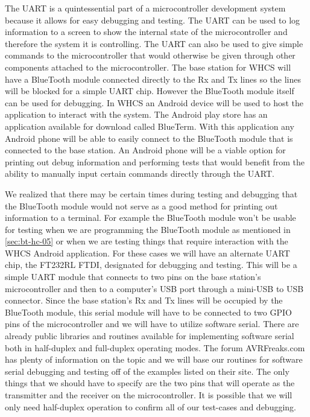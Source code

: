 The UART is a quintessential part of a microcontroller development system
because it allows for easy debugging and testing. The UART can be used to log
information to a screen to show the internal state of the microcontroller and
therefore the system it is controlling. The UART can also be used to give
simple commands to the microcontroller that would otherwise be given through
other components attached to the microcontroller. The base station for WHCS
will have a BlueTooth module connected directly to the Rx and Tx lines so the
lines will be blocked for a simple UART chip. However the BlueTooth module
itself can be used for debugging. In WHCS an Android device will be used to
host the application to interact with the system. The Android play store has an
application available for download called BlueTerm. With this application any
Android phone will be able to easily connect to the BlueTooth module that is
connected to the base station. An Android phone will be a viable option for
printing out debug information and performing tests that would benefit from the
ability to manually input certain commands directly through the UART.

We realized that there may be certain times during testing and debugging that
the BlueTooth module would not serve as a good method for printing out
information to a terminal. For example the BlueTooth module won't be
usable for testing when we are programming the BlueTooth module as mentioned in
\autoref{sec:bt-hc-05} or when we are testing things that require interaction with the
WHCS Android application. For these cases we will have an alternate UART chip,
the FT232RL FTDI, designated for debugging and testing. This will be a simple
UART module that connects to two pins on the base station's
microcontroller and then to a computer's USB port through a mini-USB to
USB connector. Since the base station's Rx and Tx lines will be
occupied by the BlueTooth module, this serial module will have to be connected
to two GPIO pins of the microcontroller and we will have to utilize software
serial. There are already public libraries and routines available for
implementing software serial both in half-duplex and full-duplex operating
modes. The forum AVRFreaks.com has plenty of information on the topic and we
will base our routines for software serial debugging and testing off of the
examples listed on their site. The only things that we should have to specify
are the two pins that will operate as the transmitter and the receiver on the
microcontroller. It is possible that we will only need half-duplex operation to
confirm all of our test-cases and debugging.

